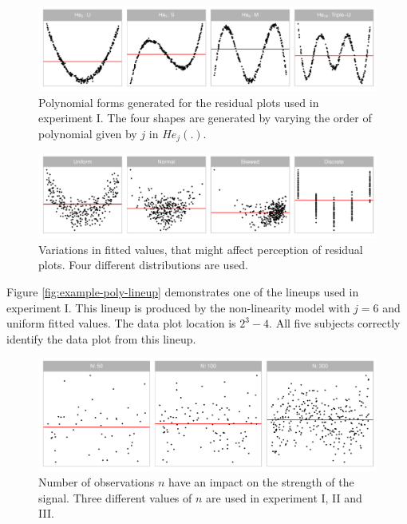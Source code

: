 \documentclass[]{interact}
\theoremstyle{plain}%
\theoremstyle{definition}
\theoremstyle{remark}
\begin{document}
\begin{figure}

{\centering \includegraphics[width=1\linewidth]{paper_comparison_files/figure-latex/different-shape-of-herimite-1} 

}

\caption{Polynomial forms generated for the residual plots used in experiment I. The four shapes are generated by varying the order of polynomial given by $j$ in $He_j(.)$.}\label{fig:different-shape-of-herimite}
\end{figure}

\begin{figure}

{\centering \includegraphics[width=1\linewidth]{paper_comparison_files/figure-latex/different-dist-1} 

}

\caption{Variations in fitted values, that might affect perception of residual plots. Four different distributions are used.}\label{fig:different-dist}
\end{figure}

Figure \ref{fig:example-poly-lineup} demonstrates one of the lineups
used in experiment I. This lineup is produced by the non-linearity model
with \(j = 6\) and uniform fitted values. The data plot location is
\(2^3 - 4\). All five subjects correctly identify the data plot from
this lineup.

\begin{figure}

{\centering \includegraphics[width=1\linewidth]{paper_comparison_files/figure-latex/different-n-1} 

}

\caption{Number of observations $n$ have an impact on the strength of the signal. Three different values of $n$ are used in experiment I, II and III.}\label{fig:different-n}
\end{figure}
\end{document}
